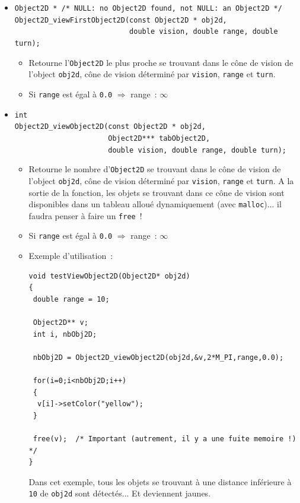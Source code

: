 \documentclass[12pt]{article}
\begin{document}
\begin{itemize}

\item \verb!Object2D * /* NULL: no Object2D found, not NULL: an Object2D */!\\
      \verb!Object2D_viewFirstObject2D(const Object2D * obj2d,!\\
      \verb!                           double vision, double range, double turn);!
      \begin{itemize}
      \item Retourne l'{\tt Object2D} le plus proche se trouvant dans le
            c\^one de vision de l'object {\tt obj2d}, c\^one de vision
            d\'etermin\'e par {\tt vision}, {\tt range} et {\tt turn}.
      \item Si {\tt range} est \'egal \`a {\tt 0.0}
            $\Longrightarrow$ range~: $\infty$
      \end{itemize}

\item \verb!int!\\
      \verb!Object2D_viewObject2D(const Object2D * obj2d,!\\
      \verb!                      Object2D*** tabObject2D,!\\
      \verb!                      double vision, double range, double turn);!
      \begin{itemize}
      \item Retourne le nombre d'{\tt Object2D} se trouvant dans le
            c\^one de vision de l'object {\tt obj2d},
            c\^one de vision d\'etermin\'e par {\tt vision}, {\tt range}
            et {\tt turn}.
            A la sortie de la fonction, les objets se trouvant dans
            ce c\^one de vision sont disponibles dans un tableau allou\'e
            dynamiquement (avec {\tt malloc})...
            il faudra penser \`a faire un {\tt free}~!
      \item Si {\tt range} est \'egal \`a {\tt 0.0}
            $\Longrightarrow$ range~: $\infty$
      \item Exemple d'utilisation~:
            
\begin{small}
\begin{verbatim}
void testViewObject2D(Object2D* obj2d)
{
 double range = 10;

 Object2D** v;
 int i, nbObj2D;

 nbObj2D = Object2D_viewObject2D(obj2d,&v,2*M_PI,range,0.0);

 for(i=0;i<nbObj2D;i++)
 {
  v[i]->setColor("yellow");
 }

 free(v);  /* Important (autrement, il y a une fuite memoire !) */
}
\end{verbatim}
\end{small}

Dans cet exemple, tous les objets se trouvant \`a une distance
inf\'erieure \`a {\tt 10} de {\tt obj2d} sont d\'etect\'es...
Et deviennent jaunes.

      \end{itemize}
\end{itemize}
\end{document}
